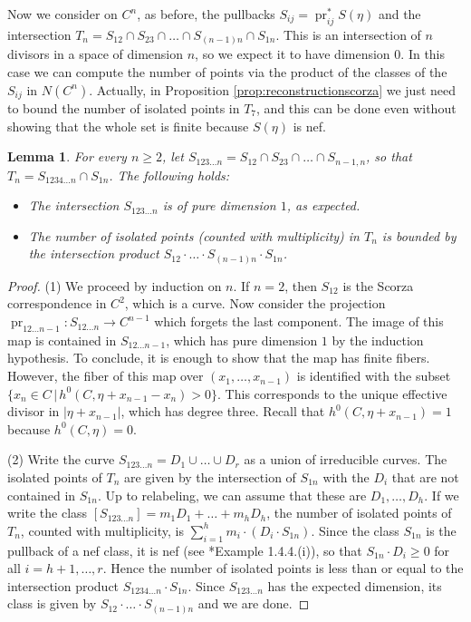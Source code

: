 \documentclass[12pt]{article}
\newtheorem{lemma}[theorem]{Lemma}
\numberwithin{equation}{section}
\theoremstyle{definition}
\DeclareMathOperator{\pr}{pr}
\begin{document}
Now we consider on $C^n$, as before, the pullbacks $S_{ij} = \pr_{ij}^*S(\eta)$ and the intersection $T_n = S_{12}\cap S_{23}\cap \dots \cap S_{(n-1)n} \cap S_{1n}$. This is an intersection of $n$ divisors in a space of dimension $n$, so we expect it to have dimension $0$. In this case we can compute the number of points  via the product of the classes of the $S_{ij}$ in $N(C^n)$. Actually, in Proposition \ref{prop:reconstructionscorza} we just need to bound the number of isolated points in $T_7$, and this can be done even without showing that the whole set is finite because $S(\eta)$ is nef.

\begin{lemma}\label{lemma:scorzabound}
	For every $n\geq 2$, let $S_{123\dots n} = S_{12}\cap S_{23}\cap \dots \cap S_{n-1,n}$, so that $T_n = S_{1234\dots n}\cap S_{1n}$. The following holds:
	\begin{itemize}
		\item[(1)] The intersection $S_{123\dots n}$ is of pure dimension $1$, as expected.
		\item[(2)] The number of isolated points (counted with multiplicity) in $T_n$ is bounded by the intersection product $S_{12}\cdot \ldots \cdot S_{(n-1)n}\cdot S_{1n}$. 
	\end{itemize}
\end{lemma}
\begin{proof}
		(1) We proceed by induction on $n$. If $n=2$, then $S_{12}$ is the Scorza correspondence in $C^2$, which is a curve. Now consider the projection $\pr_{12\ldots n-1}\colon S_{12\ldots n} \to C^{n-1}$ which forgets the last component. The image of this map is contained in $S_{12\dots n-1}$, which has pure dimension $1$ by the induction hypothesis. To conclude, it is enough to show that the map has finite fibers. However, the fiber of this map over $(x_1,\ldots,x_{n-1})$ is identified with the subset $\{x_n \in C \,|\, h^0(C,\eta+x_{n-1}-x_n)>0 \}$. This corresponds to the unique effective divisor in $|\eta+x_{n-1}|$, which has degree three. Recall that $h^0(C,\eta+x_{n-1})=1$ because $h^0(C,\eta)=0$.

		(2) Write the curve $S_{123\ldots n} = D_1\cup \dots \cup D_r$ as a union of irreducible curves. The isolated points of $T_n$ are given by the intersection of $S_{1n}$ with the $D_i$ that are not contained in $S_{1n}$. Up to relabeling, we can assume that these are $D_1,\dots,D_h$.
		If we write the class $[S_{123\dots n}] = m_1D_1+\dots+m_hD_h$, the number of isolated points of $T_n$, counted with multiplicity, is $\sum_{i=1}^h m_i \cdot (D_i\cdot S_{1n})$. Since the class $S_{1n}$ is the pullback of a nef class, it is nef (see \cite{Laz}*{Example 1.4.4.(i)}), so that $S_{1n}\cdot D_i \geq 0$ for all $i=h+1,\dots, r$. Hence the number of isolated points is less than or equal to the intersection product $S_{1234\dots n}\cdot S_{1n}$. Since $S_{123\dots n}$ has the expected dimension, its class is given by $S_{12}\cdot \ldots \cdot S_{(n-1)n}$ and we are done.
\end{proof}
\end{document}
